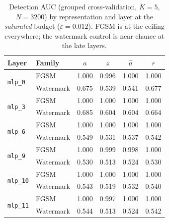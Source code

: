 \documentclass[../ppgc-tese.tex]{subfiles}
\begin{document}
\begin{table}[ht]
  \centering
  \caption{Detection AUC (grouped cross-validation, $K{=}5$, $N{=}3200$) by
  representation and layer at the \emph{saturated} budget
  ($\varepsilon{=}0.012$). FGSM is at the ceiling everywhere; the watermark
  control is near chance at the late layers.}
  \label{tab:adv-decomp}
  \small
  \begin{tabular}{@{}llcccc@{}}
    \toprule
    Layer & Family & $a$ & $z$ & $\hat{a}$ & $r$ \\
    \midrule
    \multirow{2}{*}{\texttt{mlp\_0}}  & FGSM      & 1.000 & 0.996 & 1.000 & 1.000 \\
                                      & Watermark & 0.675 & 0.539 & 0.541 & 0.677 \\
    \multirow{2}{*}{\texttt{mlp\_3}}  & FGSM      & 1.000 & 1.000 & 1.000 & 1.000 \\
                                      & Watermark & 0.685 & 0.604 & 0.604 & 0.664 \\
    \multirow{2}{*}{\texttt{mlp\_6}}  & FGSM      & 1.000 & 1.000 & 1.000 & 1.000 \\
                                      & Watermark & 0.549 & 0.531 & 0.537 & 0.542 \\
    \multirow{2}{*}{\texttt{mlp\_9}}  & FGSM      & 1.000 & 0.999 & 0.998 & 1.000 \\
                                      & Watermark & 0.530 & 0.513 & 0.524 & 0.530 \\
    \multirow{2}{*}{\texttt{mlp\_10}} & FGSM      & 1.000 & 1.000 & 1.000 & 1.000 \\
                                      & Watermark & 0.543 & 0.519 & 0.532 & 0.540 \\
    \multirow{2}{*}{\texttt{mlp\_11}} & FGSM      & 1.000 & 0.997 & 1.000 & 1.000 \\
                                      & Watermark & 0.544 & 0.513 & 0.524 & 0.542 \\
    \bottomrule
  \end{tabular}
\end{table}
\end{document}
